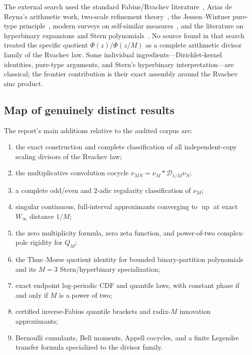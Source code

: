 \documentclass[11pt,oneside]{article}
\theoremstyle{definition}
\theoremstyle{remark}
\newcommand{\Up}{\operatorname{up}}
\numberwithin{equation}{section}
\newcommand{\D}{\mathcal D}
\newcommand{\1}{\mathbf 1}
\begin{document}
The external search used the standard Fabius/Rvachev literature~\cite{Fabius1966,Arias1982,Arias2018}, Arias de Reyna's arithmetic
work, two-scale refinement theory~\cite{DaubechiesLagariasI,DaubechiesLagariasII}, the Jessen--Wintner pure-type principle~\cite{JessenWintner1935}, modern surveys on
self-similar measures~\cite{Varju2022}, and the literature on hyperbinary expansions and Stern polynomials~\cite{DilcherEricksen2015}.
No source found in that search treated the specific quotient $\Phi(z)/\Phi(z/M)$ as a complete
arithmetic divisor family of the Rvachev law.  Some individual ingredients---Dirichlet-kernel
identities, pure-type arguments, and Stern's hyperbinary interpretation---are classical; the
frontier contribution is their exact assembly around the Rvachev sinc product.

\subsection{Map of genuinely distinct results}

The report's main additions relative to the audited corpus are:
\begin{enumerate}
\item the exact construction and complete classification of all independent-copy scaling
divisors of the Rvachev law;
\item the multiplicative convolution cocycle $\nu_{MN}=\nu_M*\D_{1/M}\nu_N$;
\item a complete odd/even and $2$-adic regularity classification of $\nu_M$;
\item singular continuous, full-interval approximants converging to $\Up$ at exact
$W_\infty$ distance $1/M$;
\item the zero multiplicity formula, zero zeta function, and power-of-two complex-pole
rigidity for $Q_M$;
\item the Thue--Morse quotient identity for bounded binary-partition polynomials and its
$M=3$ Stern/hyperbinary specialization;
\item exact endpoint log-periodic CDF and quantile laws, with constant phase if and only if
$M$ is a power of two;
\item certified inverse-Fabius quantile brackets and radix-$M$ innovation approximants;
\item Bernoulli cumulants, Bell moments, Appell cocycles, and a finite Legendre transfer
formula specialized to the divisor family.
\end{enumerate}
\end{document}
